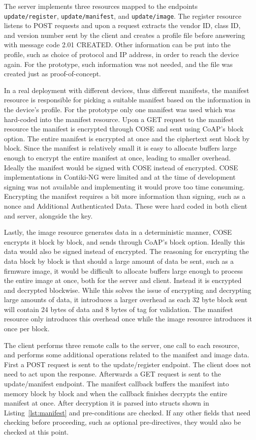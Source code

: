 \documentclass[0-thesis.tex]{subfiles}
\begin{document}
The server implements three resources mapped to the endpoints \texttt{update/register},
\texttt{update/manifest}, and \texttt{update/image}. The register resource listens to POST
requests and upon a request extracts the vendor ID, class ID, and version number sent by
the client and creates a profile file before answering with message code 2.01 CREATED.
Other information can be put into the profile, such as choice of protocol and IP address,
in order to reach the device again. For the prototype, such information was not needed,
and the file was created just as proof-of-concept.

In a real deployment with different devices, thus different manifests, the manifest
resource is responsible for picking a suitable manifest based on the information in the
device's profile. For the prototype only one manifest was used which was hard-coded into
the manifest resource. Upon a GET request to the manifest resource the manifest is
encrypted through COSE and sent using CoAP's block option. The entire manifest is
encrypted at once and the ciphertext sent block by block. Since the manifest is
relatively small it is easy to allocate buffers large enough to encrypt the entire
manifest at once, leading to smaller overhead. Ideally the manifest would be signed with
COSE instead of encrypted. COSE implementations in Contiki-NG were limited and at the time
of development signing was not available and implementing it would prove too time
consuming. Encrypting the manifest requires a bit more information than signing, such as a
nonce and Additional Authenticated Data. These were hard coded in both client and server,
alongside the key.

Lastly, the image resource generates data in a deterministic manner, COSE encrypts it
block by block, and sends through CoAP's block option. Ideally this data would also be
signed instead of encrypted. The reasoning for encrypting the data block by block is that
should a large amount of data be sent, such as a firmware image, it would be difficult to
allocate buffers large enough to process the entire image at once, both for the server and
client. Instead it is encrypted and decrypted blockwise. While this solves the issue of
encrypting and decrypting large amounts of data, it introduces a larger overhead as each
32 byte block sent will contain 24 bytes of data and 8 bytes of tag for validation. The
manifest resource only introduces this overhead once while the image resource introduces
it once per block.

The client performs three remote calls to the server, one call to each resource, and
performs some additional operations related to the manifest and image data. First a POST
request is sent to the update/register endpoint. The client does not need to act upon the
response. Afterwards a GET request is sent to the update/manifest endpoint. The manifest
callback buffers the manifest into memory block by block and when the callback finishes
decrypts the entire manifest at once. After decryption it is parsed into structs shown in
Listing~\ref{lst:manifest} and pre-conditions are checked. If any other fields that need
checking before proceeding, such as optional pre-directives, they would also be checked at
this point. 
\end{document}

